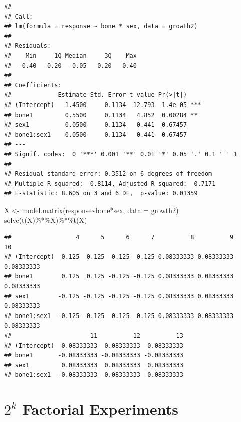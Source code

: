 \documentclass[
]{book}
\newenvironment{Shaded}{\begin{snugshade}}{\end{snugshade}}
\newcommand{\AttributeTok}[1]{\textcolor[rgb]{0.77,0.63,0.00}{#1}}
\newcommand{\FunctionTok}[1]{\textcolor[rgb]{0.00,0.00,0.00}{#1}}
\newcommand{\NormalTok}[1]{#1}
\newcommand{\OtherTok}[1]{\textcolor[rgb]{0.56,0.35,0.01}{#1}}
\newcommand{\SpecialCharTok}[1]{\textcolor[rgb]{0.00,0.00,0.00}{#1}}
\begin{document}
\begin{verbatim}
## 
## Call:
## lm(formula = response ~ bone * sex, data = growth2)
## 
## Residuals:
##    Min     1Q Median     3Q    Max 
##  -0.40  -0.20  -0.05   0.20   0.40 
## 
## Coefficients:
##             Estimate Std. Error t value Pr(>|t|)    
## (Intercept)   1.4500     0.1134  12.793  1.4e-05 ***
## bone1         0.5500     0.1134   4.852  0.00284 ** 
## sex1          0.0500     0.1134   0.441  0.67457    
## bone1:sex1    0.0500     0.1134   0.441  0.67457    
## ---
## Signif. codes:  0 '***' 0.001 '**' 0.01 '*' 0.05 '.' 0.1 ' ' 1
## 
## Residual standard error: 0.3512 on 6 degrees of freedom
## Multiple R-squared:  0.8114, Adjusted R-squared:  0.7171 
## F-statistic: 8.605 on 3 and 6 DF,  p-value: 0.01359
\end{verbatim}

\begin{Shaded}
\begin{Highlighting}[]
\NormalTok{X }\OtherTok{\textless{}{-}} \FunctionTok{model.matrix}\NormalTok{(response}\SpecialCharTok{\textasciitilde{}}\NormalTok{bone}\SpecialCharTok{*}\NormalTok{sex, }\AttributeTok{data =}\NormalTok{ growth2)}
\FunctionTok{solve}\NormalTok{(}\FunctionTok{t}\NormalTok{(X)}\SpecialCharTok{\%*\%}\NormalTok{X)}\SpecialCharTok{\%*\%}\FunctionTok{t}\NormalTok{(X)}
\end{Highlighting}
\end{Shaded}

\begin{verbatim}
##                  4      5      6      7          8          9         10
## (Intercept)  0.125  0.125  0.125  0.125 0.08333333 0.08333333 0.08333333
## bone1        0.125  0.125 -0.125 -0.125 0.08333333 0.08333333 0.08333333
## sex1        -0.125 -0.125 -0.125 -0.125 0.08333333 0.08333333 0.08333333
## bone1:sex1  -0.125 -0.125  0.125  0.125 0.08333333 0.08333333 0.08333333
##                      11          12          13
## (Intercept)  0.08333333  0.08333333  0.08333333
## bone1       -0.08333333 -0.08333333 -0.08333333
## sex1         0.08333333  0.08333333  0.08333333
## bone1:sex1  -0.08333333 -0.08333333 -0.08333333
\end{verbatim}

\hypertarget{k-factorial-experiments}{%
\chapter{\texorpdfstring{\(2^k\) Factorial Experiments}{2\^{}k Factorial Experiments}}\label{k-factorial-experiments}}
\end{document}
